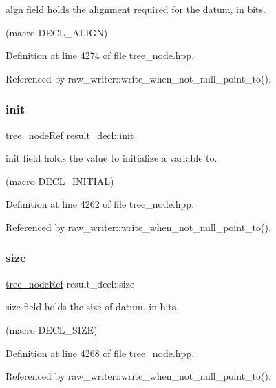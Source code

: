 algn field holds the alignment required for the datum, in bits. 

(macro D\+E\+C\+L\+\_\+\+A\+L\+I\+GN) 

Definition at line 4274 of file tree\+\_\+node.\+hpp.



Referenced by raw\+\_\+writer\+::write\+\_\+when\+\_\+not\+\_\+null\+\_\+point\+\_\+to().

\mbox{\label{structresult__decl_a9b98bd73700d1ad257eadc43c07f82a8}} 
\subsubsection{\texorpdfstring{init}{init}}
{\footnotesize\ttfamily \hyperlink{tree__node_8hpp_a6ee377554d1c4871ad66a337eaa67fd5}{tree\+\_\+node\+Ref} result\+\_\+decl\+::init}



init field holds the value to initialize a variable to. 

(macro D\+E\+C\+L\+\_\+\+I\+N\+I\+T\+I\+AL) 

Definition at line 4262 of file tree\+\_\+node.\+hpp.



Referenced by raw\+\_\+writer\+::write\+\_\+when\+\_\+not\+\_\+null\+\_\+point\+\_\+to().

\mbox{\label{structresult__decl_ae8bd48e2d4826ea104a025c3b072132e}} 
\subsubsection{\texorpdfstring{size}{size}}
{\footnotesize\ttfamily \hyperlink{tree__node_8hpp_a6ee377554d1c4871ad66a337eaa67fd5}{tree\+\_\+node\+Ref} result\+\_\+decl\+::size}



size field holds the size of datum, in bits. 

(macro D\+E\+C\+L\+\_\+\+S\+I\+ZE) 

Definition at line 4268 of file tree\+\_\+node.\+hpp.



Referenced by raw\+\_\+writer\+::write\+\_\+when\+\_\+not\+\_\+null\+\_\+point\+\_\+to().

